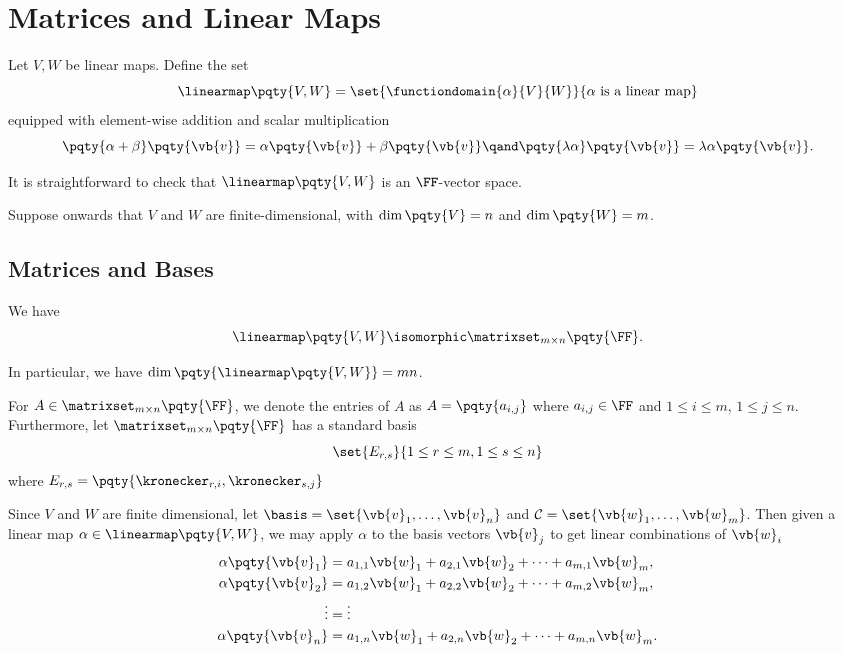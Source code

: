 \section{Matrices and Linear Maps}

Let \(V, W\) be linear maps. Define the set
\[
    \linearmap\pqty{V, W} = \set{\functiondomain{\alpha}{V}{W}}{\alpha \text{ is a linear map}}
\]
equipped with element-wise addition and scalar multiplication
\[
    \pqty{\alpha + \beta} \pqty{\vb{v}} = \alpha\pqty{\vb{v}} + \beta\pqty{\vb{v}} \qand \pqty{\lambda \alpha} \pqty{\vb{v}} = \lambda \alpha \pqty{\vb{v}}.
\]

It is straightforward to check that \(\linearmap\pqty{V, W}\) is an \(\FF\)-vector space.

Suppose onwards that \(V\) and \(W\) are finite-dimensional, with \(\dim \pqty{V} = n\) and \(\dim \pqty{W} = m\).

\subsection{Matrices and Bases}

\begin{theorem}
    \label{thm:linear-maps-matrices}%
    We have
    \[
        \linearmap\pqty{V, W} \isomorphic \matrixset_{m \times n} \pqty{\FF}.
    \]

    In particular, we have \(\dim\pqty{\linearmap\pqty{V, W}} = mn\).
\end{theorem}

\begin{notation}
    For \(A \in \matrixset_{m \times n} \pqty{\FF}\), we denote the entries of \(A\) as \(A = \pqty{a_{i, j}}\) where \(a_{i, j} \in \FF\) and \(1 \leq i \leq m\), \(1 \leq j \leq n\). Furthermore, let \(\matrixset_{m \times n}\pqty{\FF}\) has a standard basis
    \[
        \set{E_{r, s}}{1 \leq r \leq m, 1 \leq s \leq n}
    \]
    where \(E_{r, s} = \pqty{\kronecker_{r, i}, \kronecker_{s, j}}\)
\end{notation}

Since \(V\) and \(W\) are finite dimensional, let \(\basis = \set{\vb{v}_1, \ldots, \vb{v}_n}\) and \(\mathcal{C} = \set{\vb{w}_1, \ldots, \vb{w}_m}\). Then given a linear map \(\alpha \in \linearmap\pqty{V, W}\), we may apply \(\alpha\) to the basis vectors \(\vb{v}_j\) to get linear combinations of \(\vb{w}_i\)
\begin{align*}
    \alpha\pqty{\vb{v}_1} &= a_{1, 1} \vb{w}_1 + a_{2, 1} \vb{w}_2 + \cdots + a_{m, 1} \vb{w}_m, \\
    \alpha\pqty{\vb{v}_2} &= a_{1, 2} \vb{w}_1 + a_{2, 2} \vb{w}_2 + \cdots + a_{m, 2} \vb{w}_m, \\
    \vdots &= \vdots \\
    \alpha\pqty{\vb{v}_n} &= a_{1, n} \vb{w}_1 + a_{2, n} \vb{w}_2 + \cdots + a_{m, n} \vb{w}_m.
\end{align*}

